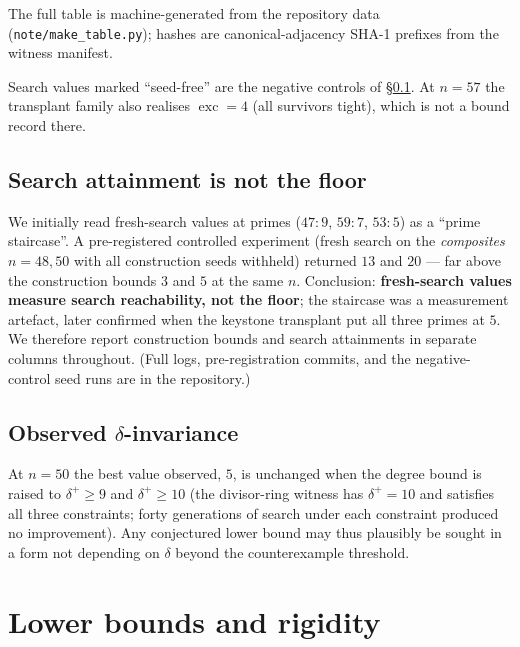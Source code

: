 \documentclass[11pt]{amsart}
\theoremstyle{remark}
\newcommand{\exc}{\operatorname{exc}}
\begin{document}
The full table is machine-generated from the repository data
(\texttt{note/make\_table.py}); hashes are canonical-adjacency SHA-1
prefixes from the witness manifest.

\begin{center}
\small

\end{center}

\noindent Search values marked ``seed-free'' are the negative controls of
\S\ref{sec:notfloor}. At $n=57$ the transplant family also realises
$\exc=4$ (all survivors tight), which is not a bound record there.

\subsection{Search attainment is not the floor}\label{sec:notfloor}

We initially read fresh-search values at primes ($47{:}9$, $59{:}7$,
$53{:}5$) as a ``prime staircase''. A pre-registered controlled experiment
(fresh search on the \emph{composites} $n = 48, 50$ with all construction
seeds withheld) returned $13$ and $20$ --- far above the construction bounds
$3$ and $5$ at the same $n$. Conclusion: \textbf{fresh-search values measure
search reachability, not the floor}; the staircase was a measurement
artefact, later confirmed when the keystone transplant put all three primes
at $5$. We therefore report construction bounds and search attainments in
separate columns throughout. (Full logs, pre-registration commits, and the
negative-control seed runs are in the repository.)

\subsection{Observed $\delta$-invariance}\label{sec:delta}

At $n = 50$ the best value observed, $5$, is unchanged when the degree
bound is raised to $\delta^+ \ge 9$ and $\delta^+ \ge 10$ (the divisor-ring witness
has $\delta^+ = 10$ and satisfies all three constraints; forty generations
of search under each constraint produced no improvement). Any conjectured
lower bound may thus plausibly be sought in a form not depending on $\delta$
beyond the counterexample threshold.

\section{Lower bounds and rigidity}\label{sec:lower}
\end{document}
